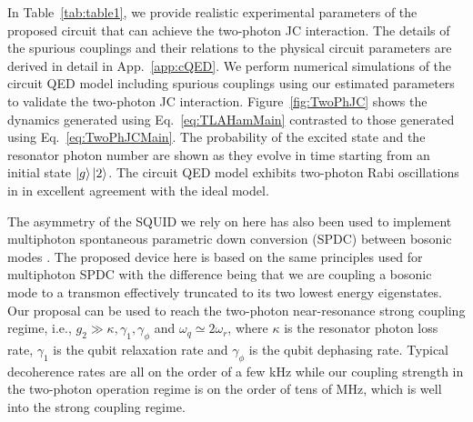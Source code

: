 In Table~\ref{tab:table1}, we provide realistic experimental parameters of the proposed circuit that can achieve the two-photon JC interaction. The details of the spurious couplings and their relations to the physical circuit parameters are derived in detail in App.~\ref{app:cQED}. We perform numerical simulations of the circuit QED model including spurious couplings using our estimated parameters to validate the two-photon JC interaction. Figure~\ref{fig:TwoPhJC} shows the dynamics generated using Eq.~\eqref{eq:TLAHamMain} contrasted to those generated using Eq.~\eqref{eq:TwoPhJCMain}. The probability of the excited state and the resonator photon number are shown as they evolve in time starting from an initial state $\ket{g}\ket{2}$. The circuit QED model exhibits two-photon Rabi oscillations in in excellent agreement with the ideal model.


The asymmetry of the SQUID we rely on here has also been used to implement multiphoton spontaneous parametric down conversion (SPDC) between bosonic modes \cite{CWilson1,CWilson2,JJEmbedded,CombinedConf,DynamicProtecCat}. The proposed device here is based on the same principles used for multiphoton SPDC with the difference being that we are coupling a bosonic mode to a transmon effectively truncated to its two lowest energy eigenstates. Our proposal can be used to reach the two-photon near-resonance strong coupling regime, i.e., $g_2\gg \kappa, \gamma_1,\gamma_\phi$ and $\omega_q\simeq 2\omega_r$, where $\kappa$ is the resonator photon loss rate, $\gamma_1$ is the qubit relaxation rate and $\gamma_\phi$ is the qubit dephasing rate. {Typical decoherence rates are all on the order of a few kHz while our coupling strength in the two-photon operation regime is on the order of tens of MHz, which is well into the strong coupling regime. } 

